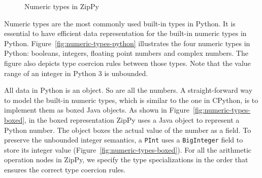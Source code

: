 \begin{figure}[t]
{  \label{fig:numeric-types-boxed}
}
\caption{Numeric types in ZipPy}
\label{fig:numeric-types-zippy}
\end{figure}

Numeric types are the most commonly used built-in types in Python.
It is essential to have efficient data representation for the built-in numeric types in Python.
Figure~\ref{fig:numeric-types-python} illustrates the four numeric types in Python: booleans, integers, floating point numbers and complex numbers.
The figure also depicts type coercion rules between those types.
Note that the value range of an integer in Python 3 is unbounded.

All data in Python is an object.
So are all the numbers.
A straight-forward way to model the built-in numeric types, which is similar to the one in CPython, is to implement them as boxed Java objects.
As shown in Figure~\ref{fig:numeric-types-boxed}, in the boxed representation ZipPy uses a Java object to represent a Python number.
The object boxes the actual value of the number as a field.
To preserve the unbounded integer semantics, a \texttt{PInt} uses a \texttt{BigInteger} field to store its integer value (Figure~\ref{fig:numeric-types-boxed}).
For all the arithmetic operation nodes in ZipPy, we specify the type specializations in the order that ensures the correct type coercion rules.

